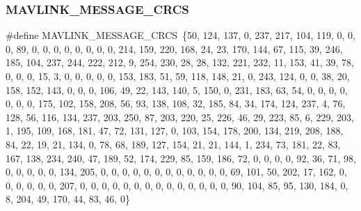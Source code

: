 \mbox{\label{ardupilotmega_8h_a3f709d5835acb54a11202a5fdc7a6bfe}} 
\subsubsection{M\+A\+V\+L\+I\+N\+K\+\_\+\+M\+E\+S\+S\+A\+G\+E\+\_\+\+C\+R\+CS}
{\footnotesize\ttfamily \#define M\+A\+V\+L\+I\+N\+K\+\_\+\+M\+E\+S\+S\+A\+G\+E\+\_\+\+C\+R\+CS~\{50, 124, 137, 0, 237, 217, 104, 119, 0, 0, 0, 89, 0, 0, 0, 0, 0, 0, 0, 0, 214, 159, 220, 168, 24, 23, 170, 144, 67, 115, 39, 246, 185, 104, 237, 244, 222, 212, 9, 254, 230, 28, 28, 132, 221, 232, 11, 153, 41, 39, 78, 0, 0, 0, 15, 3, 0, 0, 0, 0, 0, 153, 183, 51, 59, 118, 148, 21, 0, 243, 124, 0, 0, 38, 20, 158, 152, 143, 0, 0, 0, 106, 49, 22, 143, 140, 5, 150, 0, 231, 183, 63, 54, 0, 0, 0, 0, 0, 0, 0, 175, 102, 158, 208, 56, 93, 138, 108, 32, 185, 84, 34, 174, 124, 237, 4, 76, 128, 56, 116, 134, 237, 203, 250, 87, 203, 220, 25, 226, 46, 29, 223, 85, 6, 229, 203, 1, 195, 109, 168, 181, 47, 72, 131, 127, 0, 103, 154, 178, 200, 134, 219, 208, 188, 84, 22, 19, 21, 134, 0, 78, 68, 189, 127, 154, 21, 21, 144, 1, 234, 73, 181, 22, 83, 167, 138, 234, 240, 47, 189, 52, 174, 229, 85, 159, 186, 72, 0, 0, 0, 0, 92, 36, 71, 98, 0, 0, 0, 0, 0, 134, 205, 0, 0, 0, 0, 0, 0, 0, 0, 0, 0, 0, 0, 69, 101, 50, 202, 17, 162, 0, 0, 0, 0, 0, 0, 207, 0, 0, 0, 0, 0, 0, 0, 0, 0, 0, 0, 0, 0, 0, 90, 104, 85, 95, 130, 184, 0, 8, 204, 49, 170, 44, 83, 46, 0\}}

\mbox{\label{ardupilotmega_8h_a384e37b2c133fdf33407436a982d2fb7}} 
